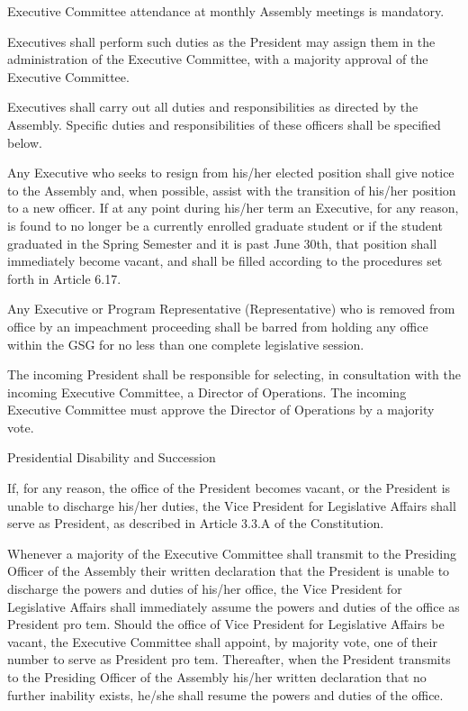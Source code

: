 \begin{bylaws-number}
  \item Executive Committee attendance at monthly Assembly meetings is mandatory.
  \item Executives shall perform such duties as the President may assign them in the administration of the Executive Committee, with a majority approval of the Executive Committee.
  \item Executives shall carry out all duties and responsibilities as directed by the Assembly. Specific duties and responsibilities of these officers shall be specified below.
  \item Any Executive who seeks to resign from his/her elected position shall give notice to the Assembly and, when possible, assist with the transition of his/her position to a new officer. If at any point during his/her term an Executive, for any reason, is found to no longer be a currently enrolled graduate student or if the student graduated in the Spring Semester and it is past June 30th, that position shall immediately become vacant, and shall be filled according to the procedures set forth in Article 6.17.
  \item Any Executive or Program Representative (Representative) who is removed from office by an impeachment proceeding shall be barred from holding any office within the GSG for no less than one complete legislative session.
  \item The incoming President shall be responsible for selecting, in consultation with the incoming Executive Committee, a Director of Operations. The incoming Executive Committee must approve the Director of Operations by a majority vote.
  \item Presidential Disability and Succession
  \begin{bylaws-number}
    \item If, for any reason, the office of the President becomes vacant, or the President is unable to discharge his/her duties, the Vice President for Legislative Affairs shall serve as President, as described in Article 3.3.A of the Constitution.
    \item Whenever a majority of the Executive Committee shall transmit to the Presiding Officer of the Assembly their written declaration that the President is unable to discharge the powers and duties of his/her office, the Vice President for Legislative Affairs shall immediately assume the powers and duties of the office as President pro tem. Should the office of Vice President for Legislative Affairs be vacant, the Executive Committee shall appoint, by majority vote, one of their number to serve as President pro tem. Thereafter, when the President transmits to the Presiding Officer of the Assembly his/her written declaration that no further inability exists, he/she shall resume the powers and duties of the office.

\end{bylaws-number}
\end{bylaws-number}
